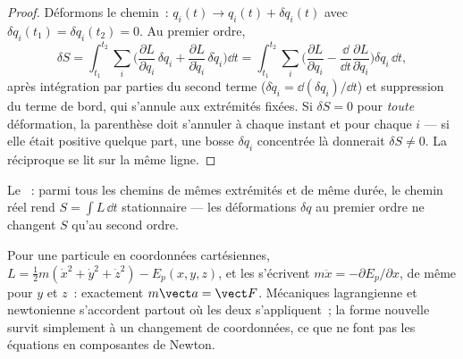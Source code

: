 \begin{proof}
Déformons le chemin~: $q_i(t) \to q_i(t) + \delta q_i(t)$ avec
$\delta q_i(t_1) = \delta q_i(t_2) = 0$. Au premier ordre,
\[
\delta S = \int_{t_1}^{t_2}\sum_i\Big(
  \frac{\partial L}{\partial q_i}\,\delta q_i
 + \frac{\partial L}{\partial\dot q_i}\,\delta\dot q_i\Big)\dd t
 = \int_{t_1}^{t_2}\sum_i\Big(
  \frac{\partial L}{\partial q_i}
 - \frac{\dd}{\dd t}\frac{\partial L}{\partial\dot q_i}\Big)\delta q_i\,\dd t ,
\]
après intégration par parties du second terme ($\delta\dot q_i =
\dd(\delta q_i)/\dd t$) et suppression du terme de bord, qui s'annule
aux extrémités fixées. Si $\delta S = 0$ pour \emph{toute} déformation,
la parenthèse doit s'annuler à chaque instant et pour chaque $i$ ---
si elle était positive quelque part, une bosse $\delta q_i$ concentrée
là donnerait $\delta S \neq 0$. La réciproque se lit sur la même ligne.
\end{proof}

\begin{omfigure}

{\small Le ~: parmi tous les chemins de mêmes
extrémités et de même durée, le chemin réel rend $S = \int L\,\dd t$
stationnaire --- les déformations $\delta q$ au premier ordre ne
changent $S$ qu'au second ordre.}
\end{omfigure}

\begin{proposition}\label{prop:b3:lagrangian-mechanics:newton}
Pour une particule en coordonnées cartésiennes, $L = \tfrac12 m(\dot x^2 +
\dot y^2 + \dot z^2) - E_p(x,y,z)$, et les 
s'écrivent $m\ddot x = -\partial E_p/\partial x$, de même pour $y$ et $z$~:
exactement $m\vect a = \vect F$. Mécaniques lagrangienne et newtonienne
s'accordent partout où les deux s'appliquent~; la forme nouvelle survit
simplement à un changement de coordonnées, ce que ne font pas les
équations en composantes de Newton.
\end{proposition}

